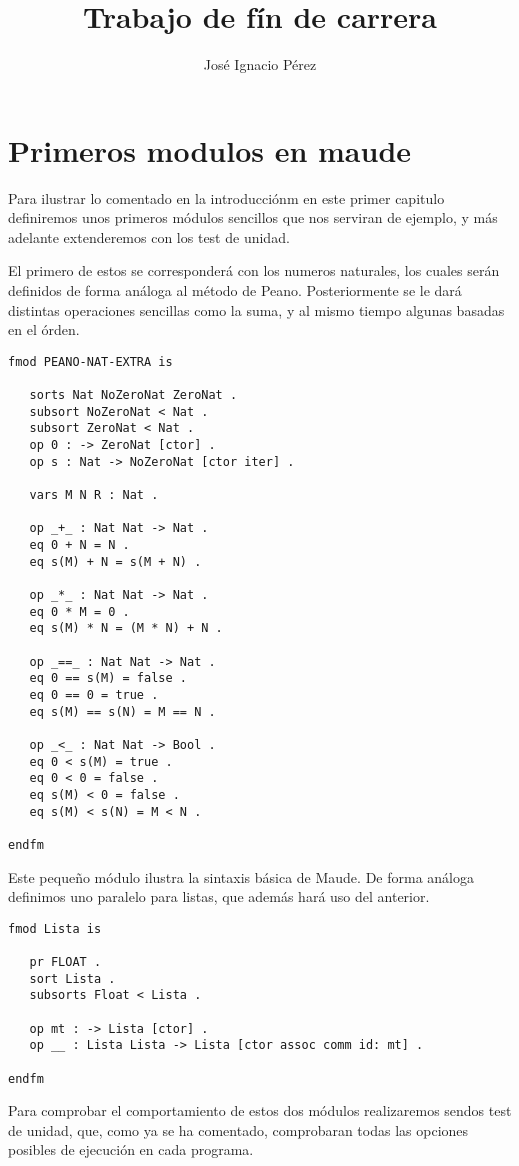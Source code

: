 \documentclass[12pt,a4paper]{book}
\author{Jos\'e Ignacio P\'erez}
\title{Trabajo de f\'in de carrera}
\begin{document}
\tableofcontents

\chapter{Primeros modulos en maude}\label{cap.1}
Para ilustrar lo comentado en la introducci\'onm en este primer capitulo definiremos unos primeros m\'odulos sencillos que nos serviran de ejemplo, y m\'as adelante extenderemos con los test de unidad. \par
El primero de estos se corresponder\'a con los numeros naturales, los cuales ser\'an definidos de forma an\'aloga al m\'etodo de Peano. Posteriormente se le dar\'a distintas operaciones sencillas como la suma, y al mismo tiempo algunas basadas en el \'orden.\par
\begin{verbatim}
fmod PEANO-NAT-EXTRA is

   sorts Nat NoZeroNat ZeroNat .
   subsort NoZeroNat < Nat .
   subsort ZeroNat < Nat .
   op 0 : -> ZeroNat [ctor] .
   op s : Nat -> NoZeroNat [ctor iter] .

   vars M N R : Nat .

   op _+_ : Nat Nat -> Nat .
   eq 0 + N = N .
   eq s(M) + N = s(M + N) .

   op _*_ : Nat Nat -> Nat .
   eq 0 * M = 0 .
   eq s(M) * N = (M * N) + N .
	
   op _==_ : Nat Nat -> Nat .
   eq 0 == s(M) = false .
   eq 0 == 0 = true .
   eq s(M) == s(N) = M == N .
	
   op _<_ : Nat Nat -> Bool .
   eq 0 < s(M) = true .
   eq 0 < 0 = false .
   eq s(M) < 0 = false .
   eq s(M) < s(N) = M < N .

endfm
\end{verbatim}

Este pequeño m\'odulo ilustra la sintaxis b\'asica de Maude. De forma an\'aloga definimos uno paralelo para listas, que adem\'as har\'a uso del anterior. \par

\begin{verbatim}
fmod Lista is

   pr FLOAT .
   sort Lista .
   subsorts Float < Lista .
	
   op mt : -> Lista [ctor] .
   op __ : Lista Lista -> Lista [ctor assoc comm id: mt] .

endfm
\end{verbatim}

Para comprobar el comportamiento de estos dos m\'odulos realizaremos sendos test de unidad, que, como ya se ha comentado, comprobaran todas las opciones posibles de ejecuci\'on en cada programa. \par
\end{document}
